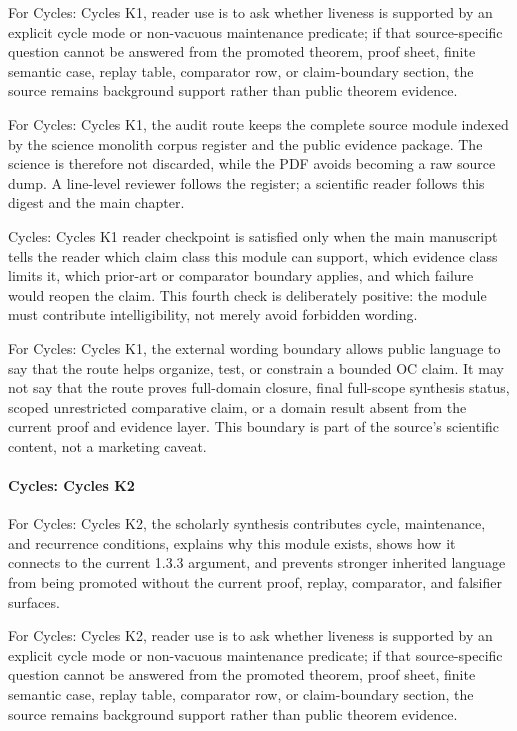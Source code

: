 For Cycles: Cycles K1, reader use is to ask whether liveness is supported by an explicit cycle mode or non-vacuous maintenance predicate; if that source-specific question cannot be answered from the promoted theorem, proof sheet, finite semantic case, replay table, comparator row, or claim-boundary section, the source remains background support rather than public theorem evidence.


For Cycles: Cycles K1, the audit route keeps the complete source module indexed by the science monolith corpus register and the public evidence package. The science is therefore not discarded, while the PDF avoids becoming a raw source dump. A line-level reviewer follows the register; a scientific reader follows this digest and the main chapter.


Cycles: Cycles K1 reader checkpoint is satisfied only when the main manuscript tells the reader which claim class this module can support, which evidence class limits it, which prior-art or comparator boundary applies, and which failure would reopen the claim. This fourth check is deliberately positive: the module must contribute intelligibility, not merely avoid forbidden wording.


For Cycles: Cycles K1, the external wording boundary allows public language to say that the route helps organize, test, or constrain a bounded OC claim. It may not say that the route proves full-domain closure, final full-scope synthesis status, scoped unrestricted comparative claim, or a domain result absent from the current proof and evidence layer. This boundary is part of the source's scientific content, not a marketing caveat.


\paragraph{Cycles: Cycles K2}

For Cycles: Cycles K2, the scholarly synthesis contributes cycle, maintenance, and recurrence conditions, explains why this module exists, shows how it connects to the current 1.3.3 argument, and prevents stronger inherited language from being promoted without the current proof, replay, comparator, and falsifier surfaces.


For Cycles: Cycles K2, reader use is to ask whether liveness is supported by an explicit cycle mode or non-vacuous maintenance predicate; if that source-specific question cannot be answered from the promoted theorem, proof sheet, finite semantic case, replay table, comparator row, or claim-boundary section, the source remains background support rather than public theorem evidence.


